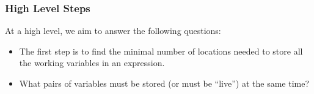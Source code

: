 \documentclass[letterpaper]{article}
\begin{document}
\subsubsection{High Level Steps}
At a high level, we aim to answer the following questions:
\begin{itemize}
    \item The first step is to find the minimal number of locations needed to store all the working variables in an expression.
    \item What pairs of variables must be stored (or must be ``live'') at the same time? 
\end{itemize}
\end{document}
